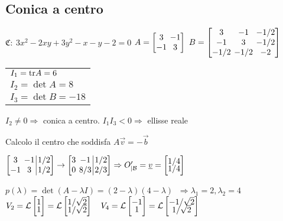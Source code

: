 \subsection{Conica a centro}
$\mathfrak{C}:\ 3x^2-2xy+3y^2-x-y-2=0$
$
A = \left[
	\arraycolsep=2.0pt\def\arraystretch{1.0}
	\begin{array}{@{}cc@{}}
		3  & -1 \\
		-1 & 3
	\end{array}
\right]
\
B = \left[
	\arraycolsep=2.0pt\def\arraystretch{1.0}
	\begin{array}{@{}ccc@{}}
		3  & -1 & -1/2 \\
		-1 & 3  & -1/2 \\
		-1/2  & -1/2 & -2 \\
	\end{array}
\right]
$
\begin{tabular}{l}
	$I_1 = \mathrm{tr} A = 6$ \\
	$I_2 = \det A = 8$ \\ 
	$I_3 = \det B = -18$
\end{tabular}

$I_2 \neq 0 \Rightarrow$ conica a centro. $I_1 I_3 < 0 \Rightarrow$ ellisse reale

Calcolo il centro che soddisfa $A \vec{v} = -\vec{b}$

$
\left[
	\arraycolsep=2.0pt\def\arraystretch{1.0}
	\begin{array}{@{}cc|c@{}}
		3  & -1 & 1/2 \\
		-1 & 3  & 1/2
	\end{array}
\right]
\rightarrow
\left[
	\arraycolsep=2.0pt\def\arraystretch{1.0}
	\begin{array}{@{}cc|c@{}}
		3  & -1   & 1/2 \\
		0  & 8/3  & 2/3 
	\end{array}
\right]
\Rightarrow
O'_{|\Base} = \vec{v} =
\begin{bmatrix}
	1/4 \\[-0.3em]
	1/4 \\
\end{bmatrix}
$

$p(\lambda) = \det(A-\lambda I) = (2-\lambda)(4-\lambda)$
$\ \Rightarrow \lambda_1 = 2, \lambda_2 = 4$
$V_2 = \mathcal{L} 
\begin{bmatrix}
	1 \\[-0.3em]
	1 \\
\end{bmatrix}
= \mathcal{L}
\begin{bmatrix}
	1/\sqrt{2} \\[-0.3em]
	1/\sqrt{2} \\
\end{bmatrix}
\quad
V_4 = \mathcal{L} 
\begin{bmatrix}
	-1 \\[-0.3em]
	1 \\
\end{bmatrix}
= \mathcal{L}
\begin{bmatrix}
	-1/\sqrt{2} \\[-0.3em]
	1/\sqrt{2} \\
\end{bmatrix}
$


